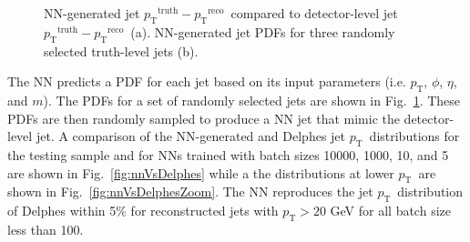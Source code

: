\documentclass[showpacs,showkeys,preprint,prd,nofootinbib,linenumbers,12pt,superscriptaddress]{revtex4-1}
\def\pt{\ensuremath{p_{\mathrm{T}}}}
\def\ptRes{\ensuremath{\pt^{\mathrm{truth}}-\pt^{\mathrm{reco}}}}
\begin{document}
\begin{figure}[htb]
  \caption{NN-generated jet \ptRes\ compared to detector-level jet \ptRes\ (a). NN-generated jet PDFs for three randomly selected truth-level jets (b).}
  \label{fig:pdfComp}
\end{figure}

The NN predicts a PDF for each jet based on its input parameters (i.e. \pt, $\phi$, $\eta$, and $m$). The PDFs for a set of randomly selected jets are shown in Fig.~\ref{fig:pdfComp}. These PDFs are then randomly sampled to produce a NN jet that mimic the detector-level jet. A comparison of the NN-generated and Delphes jet \pt\ distributions for the testing sample and for NNs trained with batch sizes 10000, 1000, 10, and 5 are shown in Fig.~\ref{fig:nnVsDelphes} while a the distributions at lower \pt\ are shown in Fig.~\ref{fig:nnVsDelphesZoom}. The NN reproduces the jet \pt\ distribution of Delphes within 5\% for reconstructed jets with $\pt>20$ GeV for all batch size less than 100. 
\end{document}
